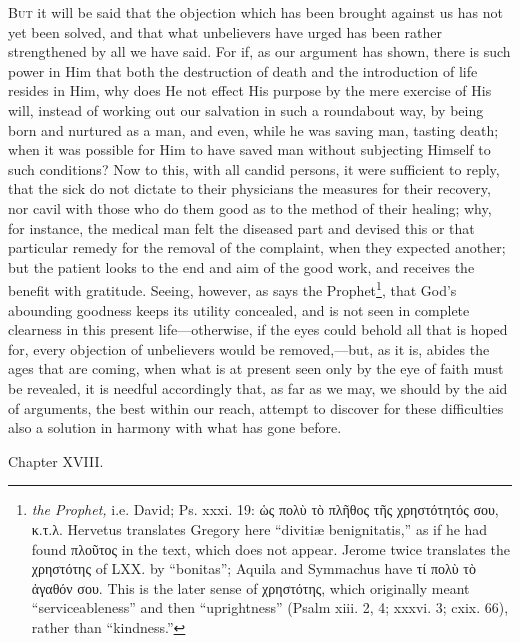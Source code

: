 \textsc{But} it will be said that the objection which has been brought against us has not yet been solved, and that what unbelievers have urged has been rather strengthened by all we have said. For if, as our argument has shown, there is such power in Him that both the destruction of death and the introduction of life resides in Him, why does He not effect His purpose by the mere exercise of His will, instead of working out our salvation in such a roundabout way, by being born and nurtured as a man, and even, while he was saving man, tasting death; when it was possible for Him to have saved man without subjecting Himself to such conditions? Now to this, with all candid persons, it were sufficient to reply, that the sick do not dictate to their physicians the measures for their recovery, nor cavil with those who do them good as to the method of their healing; why, for instance, the medical man felt the diseased part and devised this or that particular remedy for the removal of the complaint, when they expected another; but the patient looks to the end and aim of the good work, and receives the benefit with gratitude. Seeing, however, as says the Prophet\footnote{\emph{the Prophet,} i.e. David; Ps. xxxi. 19: \textgreek{ὡς πολὺ τὸ πλῆθος τῆς χρηστότητός σου, κ.τ.λ}. Hervetus translates Gregory here “divitiæ benignitatis,” as if he had found \textgreek{πλοῦτος} in the text, which does not appear. Jerome twice translates the \textgreek{χρηστότης} of LXX. by “bonitas”; Aquila and Symmachus have \textgreek{τί πολὺ τὸ ἀγαθόν σου}. This is the later sense of \textgreek{χρηστότης}, which originally meant “serviceableness” and then “uprightness” (Psalm xiii. 2, 4; xxxvi. 3; cxix. 66), rather than “kindness.”}, that God’s abounding goodness keeps its utility concealed, and is not seen in complete clearness in this present life—otherwise, if the eyes could behold all that is hoped for, every objection of unbelievers would be removed,—but, as it is, abides the ages that are coming, when what is at present seen only by the eye of faith must be revealed, it is needful accordingly that, as far as we may, we should by the aid of arguments, the best within our reach, attempt to discover for these difficulties also a solution in harmony with what has gone before.


Chapter XVIII.

